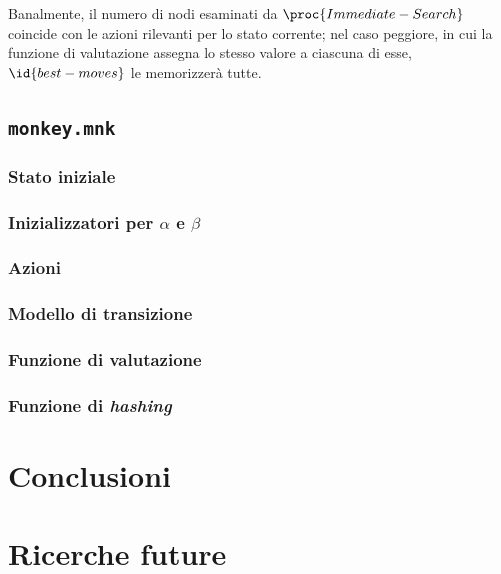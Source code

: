 \documentclass{article}
\begin{document}
Banalmente, il numero di nodi esaminati da $\proc{Immediate-Search}$ coincide
con le azioni rilevanti per lo stato corrente; nel caso peggiore, in cui la
funzione di valutazione assegna lo stesso valore a ciascuna di esse,
$\id{best-moves}$ le memorizzerà tutte.

\subsection{\texttt{monkey.mnk}}

\subsubsection{Stato iniziale}

\subsubsection{Inizializzatori per $\alpha$ e $\beta$}

\subsubsection{Azioni} \label{pattern-search}

\subsubsection{Modello di transizione}

\subsubsection{Funzione di valutazione}

\subsubsection{Funzione di \emph{hashing}}

\section{Conclusioni}

\section{Ricerche future}

\pagebreak

\begin{sloppypar}
\printbibliography[
  heading=bibintoc
]
\end{sloppypar}
\end{document}

